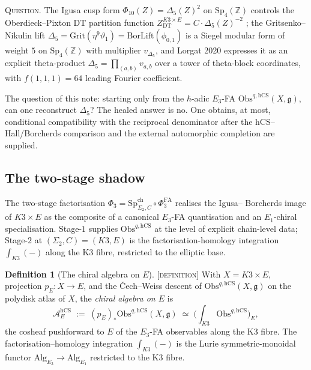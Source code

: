\documentclass[11pt]{amsart}
\providecommand{\Z}{\mathbb{Z}}
\providecommand{\cA}{\mathcal{A}}
\providecommand{\frakg}{\mathfrak{g}}
\providecommand{\Sp}{\mathrm{Sp}}
\providecommand{\Obs}{\mathrm{Obs}}
\providecommand{\hCS}{\mathrm{hCS}}
\providecommand{\Eone}{E_{1}}
\providecommand{\Ethree}{E_{3}}
\providecommand{\PhiFA}{\Phi^{\mathrm{FA}}}
\providecommand{\SpCh}{\mathrm{Sp}^{\mathrm{ch}}}
\providecommand{\BorLift}{\mathrm{BorLift}}
\providecommand{\Grit}{\mathrm{Grit}}
\providecommand{\ClaimStatusDefinition}{\textsc{[definition]}}
\theoremstyle{plain}
\theoremstyle{definition}
\newtheorem{definition}[theorem]{Definition}
\theoremstyle{remark}
\begin{document}
\textsc{Question.} The Igusa cusp form
$\Phi_{10}(Z)=\Delta_{5}(Z)^{2}$ on $\Sp_{4}(\Z)$ controls the
Oberdieck--Pixton DT partition function
$Z^{K3\times E}_{\mathrm{DT}}=C\cdot\Delta_{5}(Z)^{-2}$
\cite{OberdieckPixton2019}; the Gritsenko--Nikulin lift
$\Delta_{5}=\Grit(\eta^{9}\vartheta_{1})=\BorLift(\phi_{0,1})$
\cite{GritsenkoNikulin1995,Borcherds1998} is a Siegel modular form of
weight $5$ on $\Sp_{4}(\Z)$ with multiplier $v_{\Delta_{5}}$, and
Lorgat 2020 \cite{Lorgat2020} expresses it as an explicit theta-product
$\Delta_{5}=\prod_{(a,b)}v_{a,b}$ over a tower of theta-block coordinates,
with $f(1,1,1)=64$ leading Fourier coefficient.

The question of this note: starting only from the $\hbar$-adic
$\Ethree$-FA $\Obs^{q,\hCS}(X,\frakg)$, can one reconstruct
$\Delta_{5}$? The healed answer is no. One obtains, at most,
conditional compatibility with the reciprocal denominator after the
hCS--Hall/Borcherds comparison and the external automorphic completion
are supplied.

\subsection{The two-stage shadow}
\label{subsec:two-stage-shadow}

The two-stage factorisation
$\Phi_{3}=\SpCh_{\Sigma_{2},C}\circ\PhiFA_{3}$ realises the Igusa--%
Borcherds image of $K3\times E$ as the composite of a canonical $E_{3}$-FA
quantisation and an $\Eone$-chiral specialisation. Stage-$1$ supplies
$\Obs^{q,\hCS}$ at the level of explicit chain-level data; Stage-$2$ at
$(\Sigma_{2},C)=(K3,E)$ is the factorisation-homology integration
$\int_{K3}(-)$ along the K3 fibre, restricted to the elliptic base.

\begin{definition}[The chiral algebra on $E$]
\label{def:chiral-algebra-on-E}
\ClaimStatusDefinition{}
With $X = K3\times E$, projection $p_{E}\colon X\to E$, and the
\v{C}ech--Weiss descent of
$\Obs^{q,\hCS}(X,\frakg)$ on the polydisk atlas of $X$, the
\emph{chiral algebra on $E$} is
\[
\cA_{E}^{\hCS}
\;:=\;
(p_{E})_{\ast}\Obs^{q,\hCS}(X,\frakg)
\;\simeq\;
\bigl(\textstyle\int_{K3}\Obs^{q,\hCS}\bigr)_{E},
\]
the cosheaf pushforward to $E$ of the $\Ethree$-FA observables along
the K3 fibre. The factorisation--homology integration
$\int_{K3}(-)$ is the Lurie symmetric-monoidal functor
$\mathrm{Alg}_{\Ethree}\to\mathrm{Alg}_{\Eone}$
restricted to the K3 fibre.
\end{definition}
\end{document}
